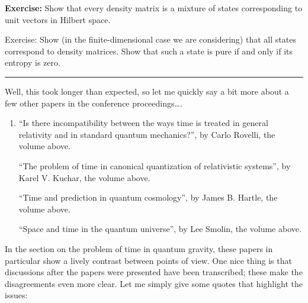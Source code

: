\documentclass{article}
\begin{document}
\textbf{Exercise:} Show that every density matrix is a mixture of states
corresponding to unit vectors in Hilbert space.

Exercise: Show (in the finite-dimensional case we are considering) that
all states correspond to density matrices. Show that such a state is
pure if and only if its entropy is zero.

\begin{center}\rule{0.5\linewidth}{0.5pt}\end{center}

Well, this took longer than expected, so let me quickly say a bit more
about a few other papers in the conference proceedings\ldots.

\begin{enumerate}
\def\labelenumi{\arabic{enumi})}
\setcounter{enumi}{2}
\item
  ``Is there incompatibility between the ways time is treated in general
  relativity and in standard quantum mechanics?'', by Carlo Rovelli, the
  volume above.

  ``The problem of time in canonical quantization of relativistic
  systems'', by Karel V. Kuchar, the volume above.

  ``Time and prediction in quantum cosmology'', by James B. Hartle, the
  volume above.

  ``Space and time in the quantum universe'', by Lee Smolin, the volume
  above.
\end{enumerate}

In the section on the problem of time in quantum gravity, these papers
in particular show a lively contrast between points of view. One nice
thing is that discussions after the papers were presented have been
transcribed; these make the disagreements even more clear. Let me simply
give some quotes that highlight the issues:
\end{document}
